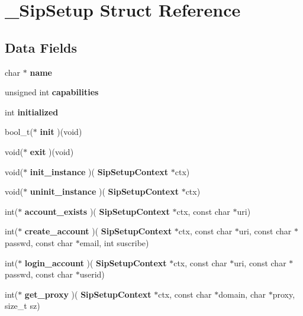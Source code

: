 \section{\+\_\+\+Sip\+Setup Struct Reference}
\label{struct__SipSetup}
\subsection*{Data Fields}
\begin{DoxyCompactItemize}
\item 
\mbox{\label{struct__SipSetup_ac7acd4545ce08608ae9012d42fa193d3}} 
char $\ast$ {\bfseries name}
\item 
\mbox{\label{struct__SipSetup_a47978b8af7d3832af5b3d35754decdc6}} 
unsigned int {\bfseries capabilities}
\item 
\mbox{\label{struct__SipSetup_a1867bdeab07a7e70b17b6f9d6782d711}} 
int {\bfseries initialized}
\item 
\mbox{\label{struct__SipSetup_a7ebe2d99be4b6399e1665e2e6c914011}} 
bool\+\_\+t($\ast$ {\bfseries init} )(void)
\item 
\mbox{\label{struct__SipSetup_a542273a53910dea2c1474ba0a7fb8c4d}} 
void($\ast$ {\bfseries exit} )(void)
\item 
\mbox{\label{struct__SipSetup_a5fe989dc130b1b859e1031d9ddb85cb8}} 
void($\ast$ {\bfseries init\+\_\+instance} )(\textbf{ Sip\+Setup\+Context} $\ast$ctx)
\item 
\mbox{\label{struct__SipSetup_a7d7b7eee1aa1ae71e4ee3f41cf22df38}} 
void($\ast$ {\bfseries uninit\+\_\+instance} )(\textbf{ Sip\+Setup\+Context} $\ast$ctx)
\item 
\mbox{\label{struct__SipSetup_a54f45d9a8da4d38516a453864431817b}} 
int($\ast$ {\bfseries account\+\_\+exists} )(\textbf{ Sip\+Setup\+Context} $\ast$ctx, const char $\ast$uri)
\item 
\mbox{\label{struct__SipSetup_ab3bad98bc0fdf5d35ed7f6e4ae9a338a}} 
int($\ast$ {\bfseries create\+\_\+account} )(\textbf{ Sip\+Setup\+Context} $\ast$ctx, const char $\ast$uri, const char $\ast$passwd, const char $\ast$email, int suscribe)
\item 
\mbox{\label{struct__SipSetup_a7475b14ed8491220875f76d4b47ca6eb}} 
int($\ast$ {\bfseries login\+\_\+account} )(\textbf{ Sip\+Setup\+Context} $\ast$ctx, const char $\ast$uri, const char $\ast$passwd, const char $\ast$userid)
\item 
\mbox{\label{struct__SipSetup_a636a50740c24eee54482f4831caa8425}} 
int($\ast$ {\bfseries get\+\_\+proxy} )(\textbf{ Sip\+Setup\+Context} $\ast$ctx, const char $\ast$domain, char $\ast$proxy, size\+\_\+t sz)

\end{DoxyCompactItemize}
